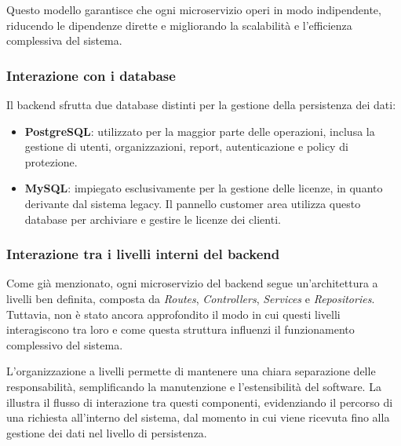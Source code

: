 Questo modello garantisce che ogni microservizio operi in modo indipendente, riducendo le dipendenze dirette e migliorando la scalabilità e l'efficienza complessiva del sistema.

\subsubsection{Interazione con i database}
Il backend sfrutta due database distinti per la gestione della persistenza dei dati:
\begin{itemize}
  \item \textbf{PostgreSQL}: utilizzato per la maggior parte delle operazioni, inclusa la gestione di utenti, organizzazioni, report, autenticazione e policy di protezione.
  \item \textbf{MySQL}: impiegato esclusivamente per la gestione delle licenze, in quanto derivante dal sistema legacy. Il pannello customer area utilizza questo database per archiviare e gestire le licenze dei clienti.
\end{itemize}

\subsubsection{Interazione tra i livelli interni del backend}
Come già menzionato, ogni microservizio del backend segue un'architettura a livelli ben definita, composta da \textit{Routes}, \textit{Controllers}, \textit{Services} e \textit{Repositories}. Tuttavia, non è stato ancora approfondito il modo in cui questi livelli interagiscono tra loro e come questa struttura influenzi il funzionamento complessivo del sistema.

L'organizzazione a livelli permette di mantenere una chiara separazione delle responsabilità, semplificando la manutenzione e l'estensibilità del software. La  illustra il flusso di interazione tra questi componenti, evidenziando il percorso di una richiesta all'interno del sistema, dal momento in cui viene ricevuta fino alla gestione dei dati nel livello di persistenza.

